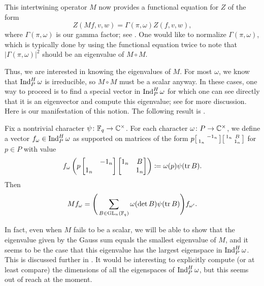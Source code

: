 \documentclass{amsart}
\begin{document}
This intertwining operator $M$ now provides a functional equation for $Z$ of the form
\[Z(Mf,v,w)=\Gamma(\pi,\omega)Z(f,v,w),\]
where $\Gamma(\pi,\omega)$ is our gamma factor; see \cite[Theorem~3.14]{chang-doubling}. One would like to normalize $\Gamma(\pi,\omega)$, which is typically done by using the functional equation twice to note that $\left|\Gamma(\pi,\omega)\right|^2$ should be an eigenvalue of $M\circ M$.

Thus, we are interested in knowing the eigenvalues of $M$. For most $\omega$, we know that $\operatorname{Ind}_P^H\omega$ is irreducible, so $M\circ M$ must be a scalar anyway. In these cases, one way to proceed is to find a special vector in $\operatorname{Ind}_P^H\omega$ for which one can see directly that it is an eigenvector and compute this eigenvalue; see \cite[Section~3.6]{chang-doubling} for more discussion. Here is our manifestation of this notion. The following result is .
\begin{theorem}
    Fix a nontrivial character $\psi\colon\mathbb F_q\to\mathbb C^\times$. For each character $\omega\colon P\to\mathbb C^\times$, we define a vector $f_\omega\in\operatorname{Ind}_P^H\omega$ as supported on matrices of the form $p\begin{bsmallmatrix}
        & -1_n \\ 1_n
    \end{bsmallmatrix}\begin{bsmallmatrix}
        1_n & B \\ & 1_n
    \end{bsmallmatrix}$ for $p\in P$ with value
    \[f_\omega\left(p\begin{bmatrix}
        & -1_n \\ 1_n
    \end{bmatrix}\begin{bmatrix}
        1_n & B \\ & 1_n
    \end{bmatrix}\right)\coloneqq\omega(p)\psi(\operatorname{tr} B).\]
    Then
    \[Mf_\omega=\Bigg(\sum_{B\in\mathrm{GL}_n(\mathbb F_q)}\omega(\det B)\psi(\operatorname{tr} B)\Bigg)f_{\omega'}.\]
\end{theorem}
\begin{remark}
    In fact, even when $M$ fails to be a scalar, we will be able to show that the eigenvalue given by the Gauss sum equals the smallest eigenvalue of $M$, and it seems to be the case that this eigenvalue has the largest eigenspace in $\operatorname{Ind}_P^H\omega$. This is discussed further in . It would be interesting to explicitly compute (or at least compare) the dimensions of all the eigenspaces of $\operatorname{Ind}_P^H\omega$, but this seems out of reach at the moment.
\end{remark}
\end{document}
